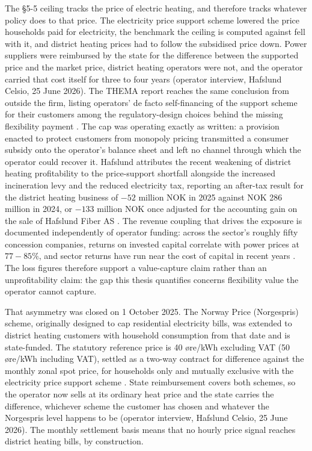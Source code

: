 The §5-5 ceiling tracks the price of electric heating, and therefore tracks whatever policy does to that price. The electricity price support scheme lowered the price households paid for electricity, the benchmark the ceiling is computed against fell with it, and district heating prices had to follow the subsidised price down. Power suppliers were reimbursed by the state for the difference between the supported price and the market price, district heating operators were not, and the operator carried that cost itself for three to four years (operator interview, Hafslund Celsio, 25 June 2026). The THEMA report reaches the same conclusion from outside the firm, listing operators' de facto self-financing of the support scheme for their customers among the regulatory-design choices behind the missing flexibility payment \cite{Thema_fjernvarme_2024}. The cap was operating exactly as written: a provision enacted to protect customers from monopoly pricing transmitted a consumer subsidy onto the operator's balance sheet and left no channel through which the operator could recover it. Hafslund attributes the recent weakening of district heating profitability to the price-support shortfall alongside the increased incineration levy and the reduced electricity tax, reporting an after-tax result for the district heating business of $-52$ million NOK in 2025 against NOK 286 million in 2024, or $-133$ million NOK once adjusted for the accounting gain on the sale of Hafslund Fiber AS \cite{hafslund_arsrapport_nodate}. The revenue coupling that drives the exposure is documented independently of operator funding: across the sector's roughly fifty concession companies, returns on invested capital correlate with power prices at $77 - 85\%$, and sector returns have run near the cost of capital in recent years \cite{jonas_erraia_lonnsomheten_2023}. The loss figures therefore support a value-capture claim rather than an unprofitability claim: the gap this thesis quantifies concerns flexibility value the operator cannot capture.

That asymmetry was closed on 1 October 2025. The Norway Price (Norgespris) scheme, originally designed to cap residential electricity bills, was extended to district heating customers with household consumption from that date and is state-funded. The statutory reference price is 40 øre/kWh excluding VAT (50 øre/kWh including VAT), settled as a two-way contract for difference against the monthly zonal spot price, for households only and mutually exclusive with the electricity price support scheme \cite{energidepartementet_forskrift_2025, nve_norgespris_2026}. State reimbursement covers both schemes, so the operator now sells at its ordinary heat price and the state carries the difference, whichever scheme the customer has chosen and whatever the Norgespris level happens to be (operator interview, Hafslund Celsio, 25 June 2026). The monthly settlement basis means that no hourly price signal reaches district heating bills, by construction.

